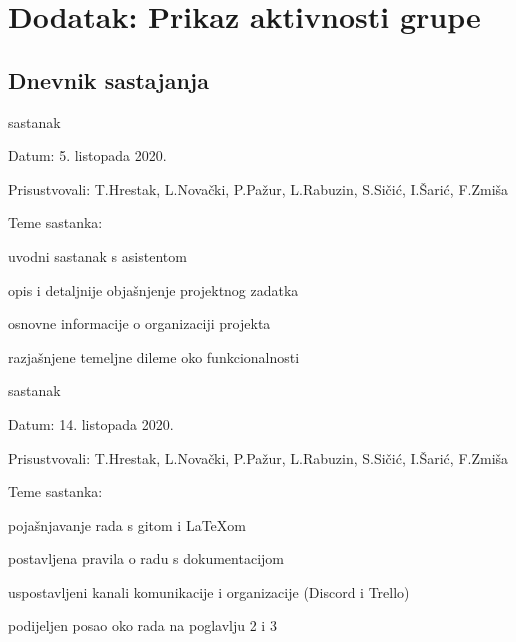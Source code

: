 \chapter*{Dodatak: Prikaz aktivnosti grupe}
		
		\section*{Dnevnik sastajanja}
		
		\begin{packed_enum}
			\item  sastanak
			
			\item[] \begin{packed_item}
				\item Datum: 5. listopada 2020.
				\item Prisustvovali: T.Hrestak, L.Novački, P.Pažur, L.Rabuzin, S.Sičić, I.Šarić, F.Zmiša
				\item Teme sastanka:
				\begin{packed_item}
					\item  uvodni sastanak s asistentom
					\item  opis i detaljnije objašnjenje projektnog zadatka
					\item  osnovne informacije o organizaciji projekta
					\item  razjašnjene temeljne dileme oko funkcionalnosti
				\end{packed_item}
			\end{packed_item}
		
			\item  sastanak
			
			\item[] \begin{packed_item}
				\item Datum: 14. listopada 2020.
				\item Prisustvovali: T.Hrestak, L.Novački, P.Pažur, L.Rabuzin, S.Sičić, I.Šarić, F.Zmiša
				\item Teme sastanka:
				\begin{packed_item}
					\item  pojašnjavanje rada s gitom i \LaTeX om
					\item  postavljena pravila o radu s dokumentacijom
					\item  uspostavljeni kanali komunikacije i organizacije (Discord i Trello)
					\item  podijeljen posao oko rada na poglavlju 2 i 3
				\end{packed_item}
			\end{packed_item}
		

\end{packed_enum}
